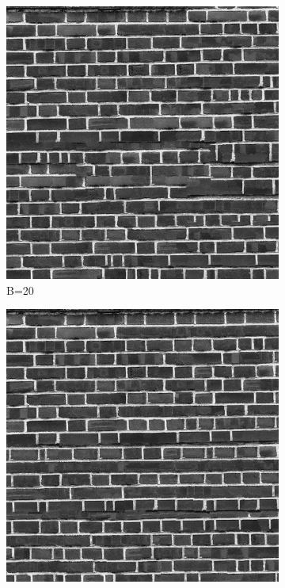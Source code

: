 \documentclass[10pt,twocolumn,letterpaper]{article}
\begin{document}
\begin{figure}[h]
    \centering
    \begin{subfigure}[h]{0.2\textwidth}
        \centering
        \includegraphics[scale=0.15]{../results/syn/out_brick_bw_B_20.png}
        \caption{B=20}
    \end{subfigure}
    \hfill
    \begin{subfigure}[h]{0.2\textwidth}
       \centering
       \includegraphics[scale=0.15]{../results/syn/out_brick_bw_B_30.png}

\end{subfigure}
\end{figure}
\end{document}
